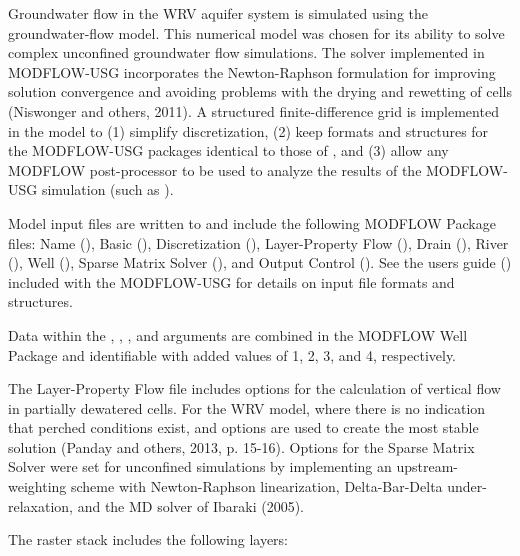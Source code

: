 \documentclass[letterpaper]{book}
\begin{document}
\begin{Details}\relax
Groundwater flow in the WRV aquifer system is simulated using the  groundwater-flow model.
This numerical model was chosen for its ability to solve complex unconfined groundwater flow simulations.
The solver implemented in MODFLOW-USG incorporates the Newton-Raphson formulation for improving solution convergence and avoiding problems with the drying and rewetting of cells (Niswonger and others, 2011).
A structured finite-difference grid is implemented in the model to
(1) simplify discretization,
(2) keep formats and structures for the MODFLOW-USG packages identical to those of , and
(3) allow any MODFLOW post-processor to be used to analyze the results of the MODFLOW-USG simulation (such as ).

Model input files are written to  and include the following MODFLOW Package files: Name (), Basic (), Discretization (), Layer-Property Flow (), Drain (), River (),  Well (), Sparse Matrix Solver (), and Output Control ().
See the users guide (\Cite{Description of Model Input and Output}) included with the MODFLOW-USG  for details on input file formats and structures.

Data within the , , , and  arguments are combined in the MODFLOW Well Package and identifiable with added  values of 1, 2, 3, and 4, respectively.

The Layer-Property Flow file includes options for the calculation of vertical flow in partially dewatered cells.
For the WRV model, where there is no indication that perched conditions exist,  and  options are used to create the most stable solution (Panday and others, 2013, p. 15-16).
Options for the Sparse Matrix Solver were set for unconfined simulations by implementing an upstream-weighting scheme with Newton-Raphson linearization, Delta-Bar-Delta under-relaxation, and the \eqn{\chi}{}MD solver of Ibaraki (2005).

The raster stack  includes the following layers:
\begin{description}


\end{description}
\end{Details}
\end{document}
